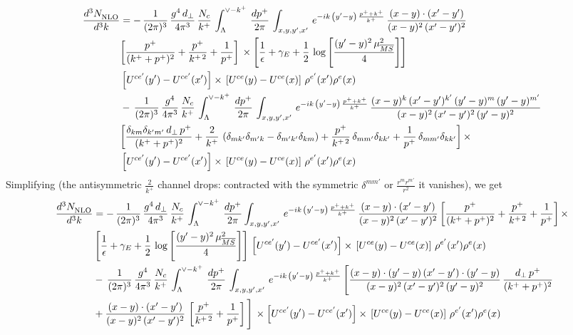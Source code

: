 \documentclass[9pt]{article}
\numberwithin{equation}{section}
\begin{document}
\begin{align}
     \frac{d^{3}N_{\rm NLO}^{\rm}}{d^{3}k}  & = -\,\frac{1}{(2\pi)^{3}}\,\frac{g^{4}\,d_{\perp}}{4\pi^{3}}\,\frac{N_{c}}{k^{+}}\,\int_{\Lambda}^{\vee-k^{+}}\, \frac{dp^{+}}{2\pi}\,\int_{x,y,y^{\prime},x'}\,e^{-ik\,\left(y'-y\right)\,\frac{p^{+}+k^{+}}{k^{+}}}\,\frac{(x-y)\cdot (x'-y')}{(x-y)^{2}\,(x'-y')^{2}}\notag \\ &  \bigg[\frac{p^{+}}{(k^{+}+p^{+})^{2}} + \frac{p^{+}}{k^{+\,2}}+\frac{1}{p^{+}}\bigg]\,\times\left[\frac{1}{\epsilon} +\gamma_{E} +\frac{1}{2}\,\log{\left[\frac{(y'-y)^{2}\,\mu^{2}_{\overline{MS}}}{4}\right]}\right]\notag \\ &  \left[U^{ce'}(y') - U^{ce'}(x')\right] \times\, \left[U^{ce}(y) - U^{ce}(x)\right]\, \rho^{e'}(x') \rho^{e}(x)\notag \\ & -\,\frac{1}{(2\pi)^{3}}\,\frac{g^{4}}{4\pi^{3}}\,\frac{N_{c}}{k^{+}}\,\int_{\Lambda}^{\vee-k^{+}}\, \frac{dp^{+}}{2\pi}\,\int_{x,y,y^{\prime},x'}\,e^{-ik\,\left(y'-y\right)\,\frac{p^{+}+k^{+}}{k^{+}}}\,\frac{(x-y)^{k}\,(x'-y')^{k'}\,(y'-y)^{m}\,(y'-y)^{m'}}{(x-y)^{2}\,(x'-y')^{2}\,(y'-y)^{2}}\notag \\ &  \bigg[\frac{\delta_{km}\delta_{k'm'}\,d_{\perp}\,p^{+}}{(k^{+}+p^{+})^{2}}+\frac{2}{k^{+}}\,\left(\delta_{mk'}\delta_{m'k}-\delta_{m'k'}\delta_{km}\right) + \frac{p^{+}}{k^{+\,2}}\,\delta_{mm'}\delta_{kk'}+\frac{1}{p^{+}}\,\delta_{mm'}\delta_{kk'}\bigg]\,\times\notag \\ &  \left[U^{ce'}(y') - U^{ce'}(x')\right] \times\, \left[U^{ce}(y) - U^{ce}(x)\right]\, \rho^{e'}(x') \rho^{e}(x)
\end{align}
Simplifying (the antisymmetric $\frac{2}{k^{+}}$ channel drops: contracted with the symmetric
$\delta^{mm'}$ or $\frac{r^{m}r^{m'}}{r^{2}}$ it vanishes), we get
\begin{align}
     \frac{d^{3}N_{\rm NLO}^{\rm}}{d^{3}k}  & = -\,\frac{1}{(2\pi)^{3}}\,\frac{g^{4}\,d_{\perp}}{4\pi^{3}}\,\frac{N_{c}}{k^{+}}\,\int_{\Lambda}^{\vee-k^{+}}\, \frac{dp^{+}}{2\pi}\int_{x,y,y^{\prime},x'}\,e^{-ik\,\left(y'-y\right)\,\frac{p^{+}+k^{+}}{k^{+}}}\,\frac{(x-y)\cdot (x'-y')}{(x-y)^{2}\,(x'-y')^{2}}\,\bigg[\frac{p^{+}}{(k^{+}+p^{+})^{2}} + \frac{p^{+}}{k^{+\,2}}+\frac{1}{p^{+}}\bigg]\,\times\notag \\ & \left[\frac{1}{\epsilon} +\gamma_{E} +\frac{1}{2}\,\log{\left[\frac{(y'-y)^{2}\,\mu^{2}_{\overline{MS}}}{4}\right]}\right]\,\left[U^{ce'}(y') - U^{ce'}(x')\right] \times\, \left[U^{ce}(y) - U^{ce}(x)\right]\, \rho^{e'}(x') \rho^{e}(x)\notag \\ & -\,\frac{1}{(2\pi)^{3}}\,\frac{g^{4}}{4\pi^{3}}\,\frac{N_{c}}{k^{+}}\,\int_{\Lambda}^{\vee-k^{+}}\, \frac{dp^{+}}{2\pi}\,\int_{x,y,y^{\prime},x'}\,e^{-ik\,\left(y'-y\right)\,\frac{p^{+}+k^{+}}{k^{+}}}\,\Bigg[\frac{(x-y)\cdot (y'-y)\, (x'-y')\cdot (y'-y)}{(x-y)^{2}\,(x'-y')^{2}\,(y'-y)^{2}}\,\frac{d_{\perp}\,p^{+}}{(k^{+}+p^{+})^{2}}\notag \\ & + \frac{(x-y)\cdot (x'-y')}{(x-y)^{2}\,(x'-y')^{2}}\,\left[\frac{p^{+}}{k^{+\,2}} + \frac{1}{p^{+}}\right]\Bigg]\,\times \left[U^{ce'}(y') - U^{ce'}(x')\right] \times\, \left[U^{ce}(y) - U^{ce}(x)\right]\, \rho^{e'}(x') \rho^{e}(x)
\end{align}
\end{document}
